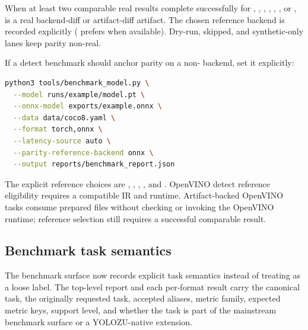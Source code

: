 When at least two comparable real results complete successfully for
, , , ,
, , or ,
 is a real backend-diff or artifact-diff artifact. The
chosen reference backend is recorded explicitly ( prefers
 when available). Dry-run, skipped, and synthetic-only lanes keep
parity non-real.

If a detect benchmark should anchor parity on a non- backend, set it
explicitly:
\begin{lstlisting}[language=bash]
python3 tools/benchmark_model.py \
  --model runs/example/model.pt \
  --onnx-model exports/example.onnx \
  --data data/coco8.yaml \
  --format torch,onnx \
  --latency-source auto \
  --parity-reference-backend onnx \
  --output reports/benchmark_report.json
\end{lstlisting}
The explicit reference choices are , , ,
\cmd{torchscript}, and . OpenVINO detect reference eligibility
requires a compatible IR and runtime. Artifact-backed OpenVINO tasks consume
prepared files without checking or invoking the OpenVINO runtime; reference
selection still requires a successful comparable result.

\subsection{Benchmark task semantics}
The benchmark surface now records explicit task semantics instead of treating
\cmd{--task} as a loose label. The top-level report and each per-format result
carry the canonical task, the originally requested task, accepted aliases,
metric family, expected metric keys, support level, and whether the task is
part of the mainstream benchmark surface or a YOLOZU-native extension.

